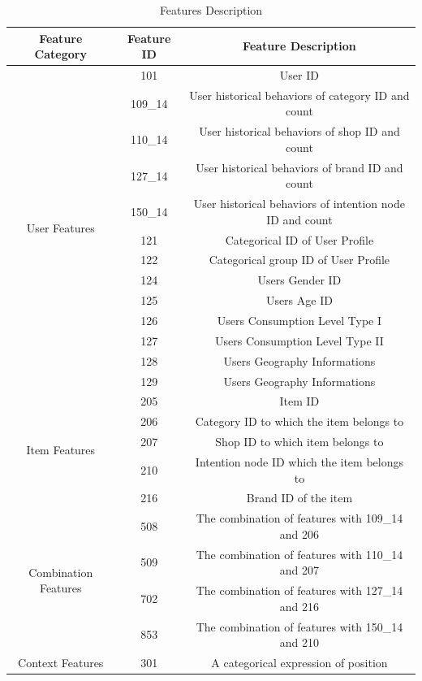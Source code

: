 \begin{table}[H]
    \centering
    \begin{tabular}{|c|c|c|}
        \hline
        \textbf{Feature Category} & \textbf{Feature ID} & \textbf{Feature Description} \\
        \hline
        \multirow{13}{*}{User Features} & 101 & User ID \\
        \cline{2-3}
        & 109\_14 & User historical behaviors of category ID and count \\
        \cline{2-3}
        & 110\_14 & User historical behaviors of shop ID and count \\
        \cline{2-3}
        & 127\_14 & User historical behaviors of brand ID and count \\
        \cline{2-3}
        & 150\_14 & User historical behaviors of intention node ID and count \\
        \cline{2-3}
        & 121 & Categorical ID of User Profile \\
        \cline{2-3}
        & 122 & Categorical group ID of User Profile \\
        \cline{2-3}
        & 124 & Users Gender ID \\
        \cline{2-3}
        & 125 & Users Age ID \\
        \cline{2-3}
        & 126 & Users Consumption Level Type I \\
        \cline{2-3}
        & 127 & Users Consumption Level Type II \\
        \cline{2-3}
        & 128 & Users Geography Informations \\
        \cline{2-3}
        & 129 & Users Geography Informations \\
        \hline
        \multirow{5}{*}{Item Features} & 205 & Item ID \\
        \cline{2-3}
        & 206 & Category ID to which the item belongs to \\
        \cline{2-3}
        & 207 & Shop ID to which item belongs to \\
        \cline{2-3}
        & 210 & Intention node ID which the item belongs to \\
        \cline{2-3}
        & 216 & Brand ID of the item \\
        \hline
        \multirow{4}{*}{Combination Features} & 508 & The combination of features with 109\_14 and 206 \\
        \cline{2-3}
        & 509 & The combination of features with 110\_14 and 207 \\
        \cline{2-3}
        & 702 & The combination of features with 127\_14 and 216 \\
        \cline{2-3}
        & 853 & The combination of features with 150\_14 and 210 \\
        \hline
        \multirow{1}{*}{Context Features} & 301 & A categorical expression of position \\
        \hline
    \end{tabular}
    \caption{Features Description}
    \label{tab:features}
\end{table}


